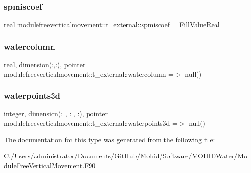 \subsubsection{\texorpdfstring{spmiscoef}{spmiscoef}}
{\footnotesize\ttfamily real modulefreeverticalmovement\+::t\+\_\+external\+::spmiscoef = Fill\+Value\+Real\hspace{0.3cm}{\ttfamily [private]}}

\mbox{\label{structmodulefreeverticalmovement_1_1t__external_aa87981703772f23df0c00468b4b25ef4}} 
\subsubsection{\texorpdfstring{watercolumn}{watercolumn}}
{\footnotesize\ttfamily real, dimension(\+:,\+:), pointer modulefreeverticalmovement\+::t\+\_\+external\+::watercolumn =$>$ null()\hspace{0.3cm}{\ttfamily [private]}}

\mbox{\label{structmodulefreeverticalmovement_1_1t__external_a63f62d6b1667f77087744d696f801356}} 
\subsubsection{\texorpdfstring{waterpoints3d}{waterpoints3d}}
{\footnotesize\ttfamily integer, dimension(\+: , \+: , \+:), pointer modulefreeverticalmovement\+::t\+\_\+external\+::waterpoints3d =$>$ null()\hspace{0.3cm}{\ttfamily [private]}}



The documentation for this type was generated from the following file\+:\begin{DoxyCompactItemize}
\item 
C\+:/\+Users/administrator/\+Documents/\+Git\+Hub/\+Mohid/\+Software/\+M\+O\+H\+I\+D\+Water/\mbox{\hyperlink{_module_free_vertical_movement_8_f90}{Module\+Free\+Vertical\+Movement.\+F90}}\end{DoxyCompactItemize}
